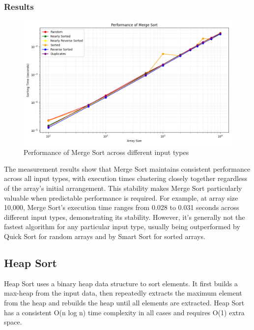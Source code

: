 \documentclass[a4paper,12pt]{article}
\begin{document}
\subsubsection{Results}
\label{sec:orgca32068}
\begin{figure}[htbp]
\centering
\includegraphics[width=.9\linewidth]{sorting_performance_merge_sort.png}
\caption{\label{fig:org017c9a1}Performance of Merge Sort across different input types}
\end{figure}

The measurement results show that Merge Sort maintains consistent performance across all input types, with execution times clustering closely together regardless of the array's initial arrangement. This stability makes Merge Sort particularly valuable when predictable performance is required. For example, at array size 10,000, Merge Sort's execution time ranges from 0.028 to 0.031 seconds across different input types, demonstrating its stability. However, it's generally not the fastest algorithm for any particular input type, usually being outperformed by Quick Sort for random arrays and by Smart Sort for sorted arrays.
\subsection{Heap Sort}
\label{sec:org9e7de18}
Heap Sort uses a binary heap data structure to sort elements. It first builds a max-heap from the input data, then repeatedly extracts the maximum element from the heap and rebuilds the heap until all elements are extracted. Heap Sort has a consistent O(n log n) time complexity in all cases and requires O(1) extra space.
\end{document}
